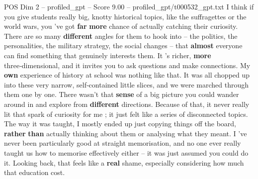 \begin{textsample}{POS Dim 2 – profiled\_gpt – Score 9.00 – profiled\_gpt/t000532\_gpt.txt}  \label{ex:f2_pos_002}
I think if you give students really big, knotty historical topics, like the suffragettes or the world wars, you ’ve got \textbf{far} \textbf{more} chance of actually catching their curiosity.
There are so many \textbf{different} angles for them to hook into – the politics, the personalities, the military strategy, the social changes – that \textbf{almost} everyone can find something that genuinely interests them.
It ’s richer, \textbf{more} three‑dimensional, and it invites you to ask questions and make connections.
My \textbf{own} experience of history at school was nothing like that.
It was all chopped up into these very narrow, self‑contained little slices, and we were marched through them one by one.
There wasn't that \textbf{sense} of a big picture you could wander around in and explore from \textbf{different} directions.
Because of that, it never really lit that spark of curiosity for me ; it just felt like a series of disconnected topics.
The way it was taught, I mostly ended up just copying things off the board, \textbf{rather} \textbf{than} actually thinking about them or analysing what they meant.
I ’ve never been particularly good at straight memorisation, and no one ever really taught us how to memorise effectively either – it was just assumed you could do it.
Looking back, that feels like a \textbf{real} shame, especially considering how much that education cost.

\end{textsample}
